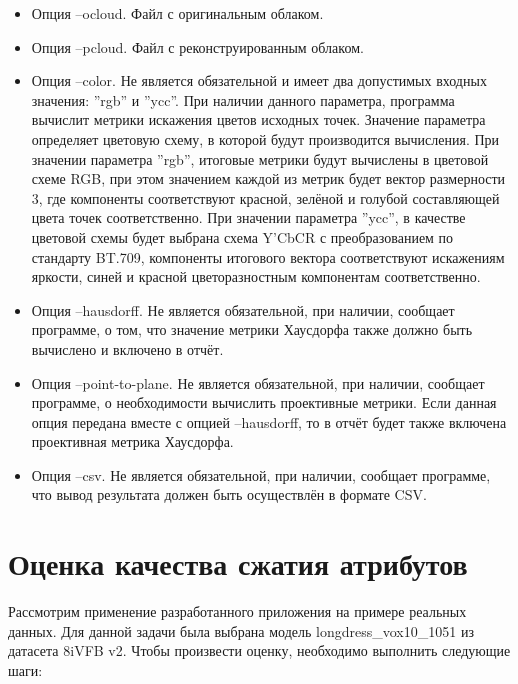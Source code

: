 \begin{itemize}
    \item Опция --ocloud. Файл с оригинальным облаком.
    \item Опция --pcloud. Файл с реконструированным облаком.
    \item Опция --color. Не является обязательной и имеет два допустимых входных
    значения: ''rgb'' и ''ycc''. При наличии данного параметра, программа
    вычислит метрики искажения цветов исходных точек. Значение параметра
    определяет цветовую схему, в которой будут производится вычисления. При
    значении параметра ''rgb'', итоговые метрики будут вычислены в цветовой
    схеме RGB, при этом значением каждой из метрик будет вектор размерности 3,
    где компоненты соответствуют красной, зелёной и голубой составляющей цвета
    точек соответственно. При значении параметра ''ycc'', в качестве цветовой
    схемы будет выбрана схема Y'CbCR с преобразованием по стандарту BT.709,
    компоненты итогового вектора соответствуют искажениям яркости, синей и
    красной цветоразностным компонентам соответственно.
    \item Опция --hausdorff. Не является обязательной, при наличии, сообщает
    программе, о том, что значение метрики Хаусдорфа также должно быть вычислено
    и включено в отчёт.
    \item Опция --point-to-plane. Не является обязательной, при наличии,
    сообщает программе, о необходимости вычислить проективные метрики. Если
    данная опция передана вместе с опцией --hausdorff, то в отчёт будет также
    включена проективная метрика Хаусдорфа.
    \item Опция --csv. Не является обязательной, при наличии, сообщает
    программе, что вывод результата должен быть осуществлён в формате CSV.
\end{itemize}


\section{Оценка качества сжатия атрибутов}

Рассмотрим применение разработанного приложения на примере реальных данных. Для
данной задачи была выбрана модель longdress\_vox10\_1051 из датасета 8iVFB
v2\cite{LongdressDataset}. Чтобы произвести оценку, необходимо выполнить
следующие шаги:

